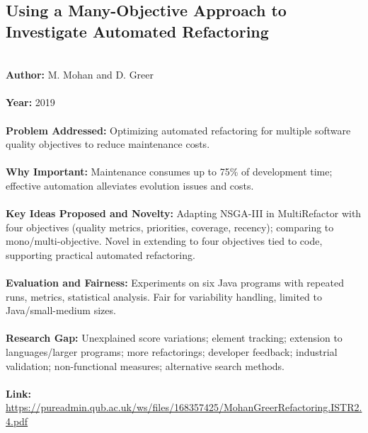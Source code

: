 \documentclass[12pt]{article}
\begin{document}
\subsection*{Using a Many-Objective Approach to Investigate Automated Refactoring}
\\
\textbf{Author:} M. Mohan and D. Greer \\
\\
\textbf{Year:} 2019 \\
\\
\textbf{Problem Addressed:} Optimizing automated refactoring for multiple software quality objectives to reduce maintenance costs. \\
\\
\textbf{Why Important:} Maintenance consumes up to 75\% of development time; effective automation alleviates evolution issues and costs. \\
\\
\textbf{Key Ideas Proposed and Novelty:} Adapting NSGA-III in MultiRefactor with four objectives (quality metrics, priorities, coverage, recency); comparing to mono/multi-objective. Novel in extending to four objectives tied to code, supporting practical automated refactoring. \\
\\
\textbf{Evaluation and Fairness:} Experiments on six Java programs with repeated runs, metrics, statistical analysis. Fair for variability handling, limited to Java/small-medium sizes. \\
\\
\textbf{Research Gap:} Unexplained score variations; element tracking; extension to languages/larger programs; more refactorings; developer feedback; industrial validation; non-functional measures; alternative search methods. \\
\\
\textbf{Link:} \url{https://pureadmin.qub.ac.uk/ws/files/168357425/MohanGreerRefactoring.ISTR2.4.pdf}
\pagebreak

\end{document}

